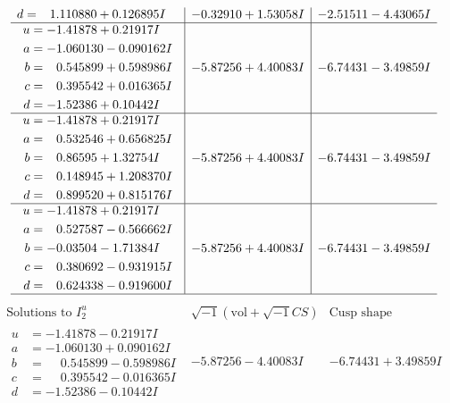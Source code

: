 \documentclass[1p]{elsarticle_modified}
\theoremstyle{definition}
\newcommand{\I}{\sqrt{-1}}
\begin{document}
$$\begin{array}{c|c|c}
\begin{aligned}
d &= \phantom{-}1.110880 + 0.126895 I\end{aligned}
 & -0.32910 + 1.53058 I & -2.51511 - 4.43065 I \\ \hline\begin{aligned}
u &= -1.41878 + 0.21917 I \\
a &= -1.060130 - 0.090162 I \\
b &= \phantom{-}0.545899 + 0.598986 I \\
c &= \phantom{-}0.395542 + 0.016365 I \\
d &= -1.52386 + 0.10442 I\end{aligned}
 & -5.87256 + 4.40083 I & -6.74431 - 3.49859 I \\ \hline\begin{aligned}
u &= -1.41878 + 0.21917 I \\
a &= \phantom{-}0.532546 + 0.656825 I \\
b &= \phantom{-}0.86595 + 1.32754 I \\
c &= \phantom{-}0.148945 + 1.208370 I \\
d &= \phantom{-}0.899520 + 0.815176 I\end{aligned}
 & -5.87256 + 4.40083 I & -6.74431 - 3.49859 I \\ \hline\begin{aligned}
u &= -1.41878 + 0.21917 I \\
a &= \phantom{-}0.527587 - 0.566662 I \\
b &= -0.03504 - 1.71384 I \\
c &= \phantom{-}0.380692 - 0.931915 I \\
d &= \phantom{-}0.624338 - 0.919600 I\end{aligned}
 & -5.87256 + 4.40083 I & -6.74431 - 3.49859 I\\
 \hline 
 \end{array}$$\newpage$$\begin{array}{c|c|c}  
\text{Solutions to }I^u_{2}& \I (\text{vol} + \sqrt{-1}CS) & \text{Cusp shape}\\
 \hline 
\begin{aligned}
u &= -1.41878 - 0.21917 I \\
a &= -1.060130 + 0.090162 I \\
b &= \phantom{-}0.545899 - 0.598986 I \\
c &= \phantom{-}0.395542 - 0.016365 I \\
d &= -1.52386 - 0.10442 I\end{aligned}
 & -5.87256 - 4.40083 I & -6.74431 + 3.49859 I \\ \hline\begin{aligned}

\end{aligned}
\end{array}$$
\end{document}
